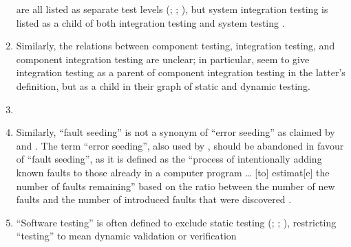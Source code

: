 \begin{enumerate}
          are all listed as separate test levels (\citealp[p.~12, Fig.~2]{IEEE2022};
          \citeyear[p.~41\==44, 46, 51, 58, 74]{IEEE2021b}; \citeyear[p.~6]{IEEE2021c}),
          but system integration testing is listed as a child of both
          integration testing \citepISTQB{} and system testing
          \citep[p.~23]{Firesmith2015}.
    \item %
          Similarly, the relations between component testing, integration
          testing, and component integration testing are unclear; in particular,
          \citetISTQB{} seem to give integration testing as a parent of component
          integration testing in the latter's definition, but as a child in
          their graph of static and dynamic testing.
    \item %
          \errorGuessFlaw{}
    \item %
          Similarly, ``fault seeding'' is not a synonym of ``error seeding''
          as claimed by \citet[p.~165]{IEEE2017} and
          \citet[p.~427]{vanVliet2000}. The term ``error seeding'', also
          used by \citet[p.~34]{Firesmith2015},
          should be abandoned in favour of ``fault seeding'', as it is defined
          as the ``process of intentionally adding known faults to those
          already in a computer program \dots{} [to] estimat[e] the number of
          faults remaining'' \citep[p.~165]{IEEE2017} based on the ratio
          between the number of new faults and the number of introduced faults
          that were discovered \citep[p.~427]{vanVliet2000}.
    \item %
          ``Software testing'' is often defined to exclude static testing
          (\citealp[p.~13]{Firesmith2015}; \citealp[p.~222]{AmmannAndOffutt2017};
          \citealp[p.~439]{PetersAndPedrycz2000}), restricting ``testing'' to
          mean dynamic validation \citep[p.~5\=/1]{SWEBOK2024} or verification

\end{enumerate}

